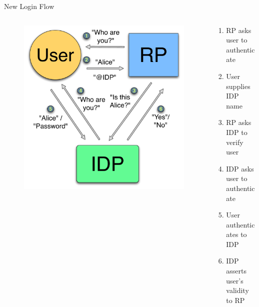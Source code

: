\documentclass[handout]{beamer}
\begin{document}
\begin{frame}{New Login Flow}
  \begin{columns}[T]
    \begin{column}{6cm}
      \begin{figure}
         \centering
         \includegraphics[scale=0.3]{figs/fig-fedlog-color.pdf}
      \end{figure}
    \end{column}
    \begin{column}{5cm}
      \begin{enumerate}
        \item RP asks user to authenticate
	\item User supplies IDP name
	\item RP asks IDP to verify user
	\item IDP asks user to authenticate
	\item User authenticates to IDP
	\item IDP asserts user's validity to RP
      \end{enumerate}
    \end{column}
  \end{columns}
\end{frame}
\end{document}
